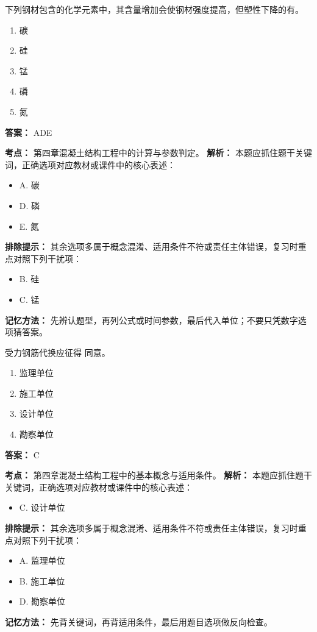 \documentclass[UTF8,fontset=fandol,11pt]{ctexart}
\begin{document}
\begin{quizbox}[title={第 12 题}]
下列钢材包含的化学元素中，其含量增加会使钢材强度提高，但塑性下降的有。\\
\begin{enumerate}[label=\Alph*.]
\item 碳
\item 硅
\item 锰
\item 磷
\item 氮
\end{enumerate}
\textbf{答案：} ADE
\vspace{0.25em}
\begin{answerbox}[title={考点解析}]
\textbf{考点：} 第四章混凝土结构工程中的计算与参数判定。
\textbf{解析：} 本题应抓住题干关键词，正确选项对应教材或课件中的核心表述：
\begin{itemize}
\item A. 碳
\item D. 磷
\item E. 氮
\end{itemize}
\textbf{排除提示：} 其余选项多属于概念混淆、适用条件不符或责任主体错误，复习时重点对照下列干扰项：
\begin{itemize}
\item B. 硅
\item C. 锰
\end{itemize}
\textbf{记忆方法：} 先辨认题型，再列公式或时间参数，最后代入单位；不要只凭数字选项猜答案。
\end{answerbox}
\end{quizbox}

\vspace{0.2em}

\begin{quizbox}[title={第 13 题}]
受力钢筋代换应征得 同意。\\
\begin{enumerate}[label=\Alph*.]
\item 监理单位
\item 施工单位
\item 设计单位
\item 勘察单位
\end{enumerate}
\textbf{答案：} C
\vspace{0.25em}
\begin{answerbox}[title={考点解析}]
\textbf{考点：} 第四章混凝土结构工程中的基本概念与适用条件。
\textbf{解析：} 本题应抓住题干关键词，正确选项对应教材或课件中的核心表述：
\begin{itemize}
\item C. 设计单位
\end{itemize}
\textbf{排除提示：} 其余选项多属于概念混淆、适用条件不符或责任主体错误，复习时重点对照下列干扰项：
\begin{itemize}
\item A. 监理单位
\item B. 施工单位
\item D. 勘察单位
\end{itemize}
\textbf{记忆方法：} 先背关键词，再背适用条件，最后用题目选项做反向检查。
\end{answerbox}
\end{quizbox}
\end{document}
